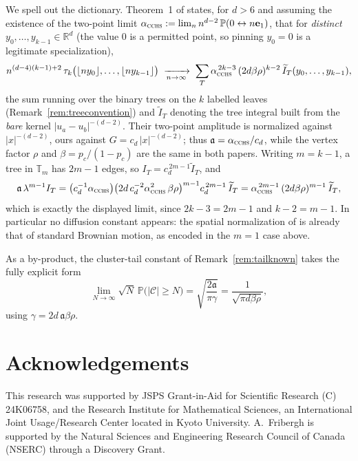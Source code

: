 \documentclass[11pt]{article}
\theoremstyle{definition}
\theoremstyle{remark}
\newcommand{\R}{\mathbb{R}}
\newcommand{\bP}{\mathbb{P}}
\newcommand{\T}{\mathbb{T}}                    %
\newcommand{\fl}[1]{\lfloor #1\rfloor}
\numberwithin{equation}{section}
\theoremstyle{plain}
\theoremstyle{definition}
\theoremstyle{remark}
\theoremstyle{plain}
\begin{document}
We spell out the dictionary. Theorem~1 of \cite{CCHS26} states, for
$d>6$ and assuming the existence of the two-point limit
$\alpha_{\textsc{cchs}}:=\lim_n n^{d-2}\,\bP(0\leftrightarrow n\mathbf e_1)$,
that for \emph{distinct} $y_0,\dots,y_{k-1}\in\R^d$ (the value $0$ is a
permitted point, so pinning $y_0=0$ is a legitimate specialization),
\[
n^{(d-4)(k-1)+2}\,
\tau_k\bigl(\fl{ny_0},\dots,\fl{ny_{k-1}}\bigr)
\;\xrightarrow[n\to\infty]{}\;
\sum_{T}\alpha_{\textsc{cchs}}^{\,2k-3}\,(2d\beta\rho)^{k-2}\,
\widetilde I_T(y_0,\dots,y_{k-1}),
\]
the sum running over the binary trees on the $k$ labelled leaves
(Remark~\ref{rem:treeconvention}) and $\widetilde I_T$ denoting the tree
integral built from the \emph{bare} kernel $|u_a-u_b|^{-(d-2)}$. Their
two-point amplitude is normalized against $|x|^{-(d-2)}$, ours against
$G=c_d\,|x|^{-(d-2)}$; thus $\mathfrak a=\alpha_{\textsc{cchs}}/c_d$, while the
vertex factor $\rho$ and $\beta=p_c/(1-p_c)$ are the same in both papers.
Writing $m=k-1$, a tree in $\T_m$ has $2m-1$ edges, so
$I_T=c_d^{\,2m-1}\widetilde I_T$, and
\[
\mathfrak a\,\lambda^{m-1}I_T
=\bigl(c_d^{-1}\alpha_{\textsc{cchs}}\bigr)
\bigl(2d\,c_d^{-2}\alpha_{\textsc{cchs}}^{2}\,\beta\rho\bigr)^{m-1}
c_d^{\,2m-1}\,\widetilde I_T
=\alpha_{\textsc{cchs}}^{\,2m-1}\,(2d\beta\rho)^{m-1}\,\widetilde I_T ,
\]
which is exactly the displayed limit, since $2k-3=2m-1$ and $k-2=m-1$. In
particular no diffusion constant appears: the spatial normalization of
\cite{CCHS26} is already that of standard Brownian motion, as encoded in the
$m=1$ case above.

As a by-product, the cluster-tail constant of Remark~\ref{rem:tailknown} takes the fully explicit form
\[
\lim_{N\to\infty}\sqrt N\,\bP\bigl(|\mathcal C|\ge N\bigr)
=\sqrt{\frac{2\mathfrak a}{\pi\gamma}}=\frac{1}{\sqrt{\pi d\beta\rho}} ,
\]
using $\gamma=2d\,\mathfrak a\beta\rho$.

\section*{Acknowledgements}
This research was supported by JSPS Grant-in-Aid for Scientific Research (C) 24K06758, and the Research Institute for Mathematical Sciences, an International Joint Usage/Research Center located in Kyoto University. A.~Fribergh is supported by the Natural Sciences and Engineering Research Council of Canada (NSERC) through a Discovery Grant.



\end{document}
